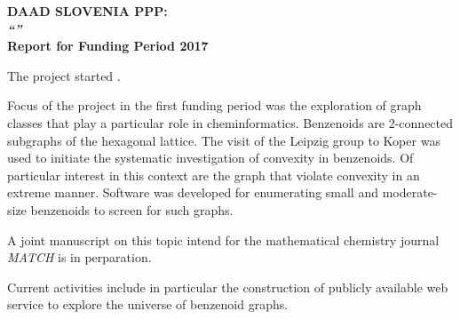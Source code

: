 \documentclass{article}
\begin{document}
 

\par\noindent\textbf{\large DAAD SLOVENIA PPP:\\[1em]
  \emph{``''}\\[1.0em]
  Report for Funding Period 2017}

The project started . 

Focus of the project in the first funding period was the exploration of
graph classes that play a particular role in cheminformatics. Benzenoids
are 2-connected subgraphs of the hexagonal lattice. The visit of the
Leipzig group to Koper  was used to initiate the systematic
investigation of convexity in benzenoids. Of particular interest in this
context are the graph that violate convexity in an extreme manner. Software
was developed for enumerating small and moderate-size benzenoids to screen
for such graphs. 


A joint manuscript on this topic intend for the mathematical chemistry
journal \emph{MATCH} is in perparation.

Current activities include in particular the construction of publicly
available web service to explore the universe of benzenoid graphs. 
\end{document}
